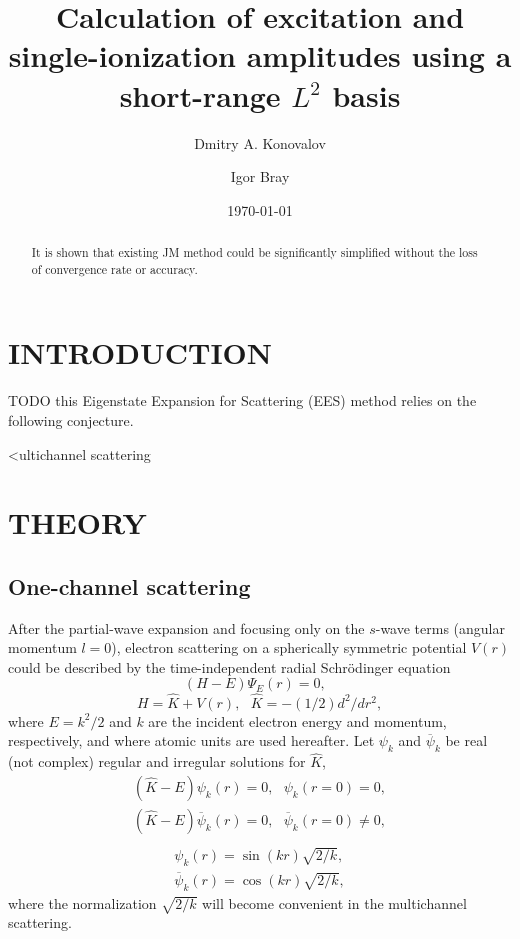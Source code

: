 \documentclass[aip
, pra
, showpacs
, aps
, twocolumn
, groupedaddress
, floatfix
]{revtex4}
\newcommand{\beq}{\begin{equation}}
\newcommand{\eeq}{\end{equation}}
\newcommand{\barr}{\begin{array}}
\newcommand{\earr}{\end{array}}
\begin{document}
\title {Calculation of excitation and single-ionization amplitudes using a short-range $L^2$ basis}

\author{Dmitry A. Konovalov}

\author{Igor Bray}


\date{\today}

\begin{abstract}
It is shown that existing JM method could be significantly simplified without the loss of convergence rate or accuracy.

\end{abstract}

\maketitle

\section{INTRODUCTION}
TODO
this Eigenstate Expansion for Scattering (EES) method relies on the following conjecture.

<ultichannel scattering \cite{CA73, NO72, TF79, Nesbet78, Lucchese86}

\section{THEORY}
\subsection{One-channel scattering}


After the partial-wave expansion \cite{Taylor72,N82} and focusing only on the $s$-wave terms (angular momentum $l=0$),
electron scattering on a spherically symmetric potential $V(r)$
could be described by the time-independent radial Schr\"odinger equation
\beq
(H-E) \Psi_E (r) =0,  \ \ \  \label{H_E_Psi_E}
\eeq
\beq
H = \hat{K} + V(r), \ \ \ \hat{K} = -(1/2) d^2/dr^2,
\eeq
where $E=k^2/2$ and $k$ are the incident electron energy and momentum, respectively, and where
atomic units are used hereafter.
Let $\psi_k$ and $\overline{\psi}_k$ be real (not complex) regular and irregular solutions for $\hat{K}$,
\beq \barr{l}
(\hat{K}-E)  \psi_k (r) =0,  \ \ \ \psi_k(r=0) = 0,\\
(\hat{K}-E)  \overline{\psi}_k (r) =0,  \ \ \ \overline{\psi}_k(r=0) \neq 0,\\
\earr \label{H_0_E_psi}\eeq
\beq \barr{l}
\psi_k(r) = \sin(kr) \sqrt{2/k},\\
\overline{\psi}_k(r) = \cos(kr) \sqrt{2/k},
\earr \label{K} \eeq
where the normalization $\sqrt{2/k}$ will become convenient in the multichannel scattering.
\end{document}
